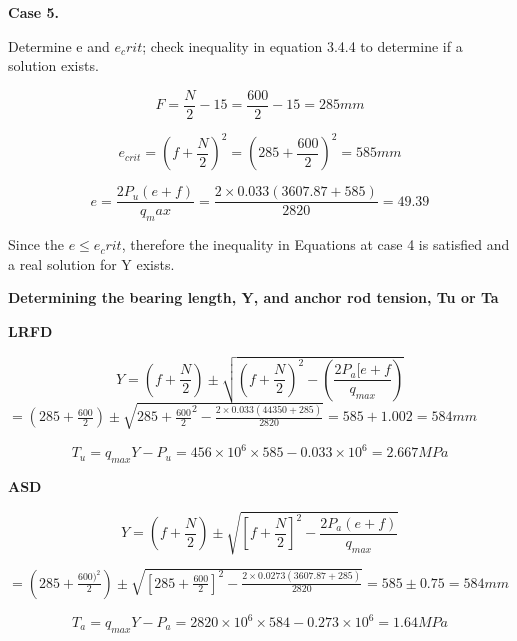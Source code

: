 {\textbf{Case 5.}


Determine e and \(e_crit\); check inequality in equation 3.4.4 to determine if a solution exists.


\begin{equation}
F = \frac{N}{2} - 15 = \frac{600}{2} - 15 = 285mm
\end{equation}

\begin{equation}
e_{crit} =    (f +\frac{N}{2})^2 = (285 + \frac{600}{2})^2 = 585mm
\end{equation}

\begin{equation}
   e = \frac{2P_u (e + f)}{q_max} =\frac {2 \times 0.033 (3607.87 +585)} {2820}= 49.39
\end{equation}

Since the \(e \leq e_crit \), therefore the inequality in Equations at case 4 is satisfied and a real solution for Y exists.




\textbf{Determining the bearing length, Y, and anchor rod tension, Tu or 
Ta}


\textbf{LRFD}

\begin{equation}
Y=\left(f+\frac{N}{2}\right)\pm\sqrt{\left(f +\frac{N}{2}\right)^2 - \left(\frac{2P_a[e+f}{q_{max}}\right)}
\end{equation}
\(= \left(285 +\frac{600}{2}\right)\pm \sqrt{285 +\frac{600} {2}^2-\frac{2\times 0.033 (44350+285)}{2820}}= 585 + 1.002 = 584mm\)

\begin{equation}
    T_u = q_{max}Y - P_u = 456 \times 10^6 \times 585 - 0.033\times 10^6 = 2.667MPa
\end{equation}



\textbf{ASD}

\begin{equation}
Y =\left(f +\frac{N}{2}\right)\pm \sqrt{\left[f + \frac{N}{2}\right]^2-\frac{2P_a(e+f)}{q_{max}}}
\end{equation}

\(=\left(285 +\frac{600)^2}{2}\right)\pm\sqrt{\left[285+\frac{600}{2}\right]^2-\frac{2\times0.0273(3607.87+285)}{2820}} = 585\pm 0.75 = 584mm \)

\begin{equation}
    T_a = q_{max}Y - P_a = 2820\times10^6 \times 584- 0.273\times10^6 = 1.64MPa
\end{equation}


}

